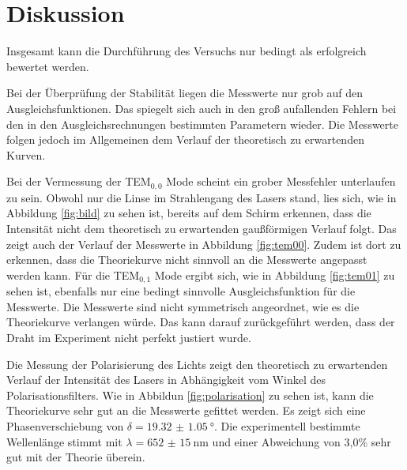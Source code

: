 \section{Diskussion}
\label{sec:Diskussion}
Insgesamt kann die Durchführung des Versuchs nur bedingt als erfolgreich
bewertet werden.

Bei der Überprüfung der Stabilität liegen die Messwerte nur grob auf den
Ausgleichsfunktionen. Das spiegelt sich auch in den groß aufallenden Fehlern bei
den in den Ausgleichsrechnungen bestimmten Parametern wieder. Die Messwerte folgen
jedoch im Allgemeinen dem Verlauf der theoretisch zu erwartenden Kurven.

Bei der Vermessung der TEM$_{\mathrm{0,0}}$ Mode scheint ein grober Messfehler
unterlaufen zu sein. Obwohl nur die Linse im Strahlengang des Lasers
stand, lies sich, wie in Abbildung \ref{fig:bild} zu sehen ist, bereits auf dem
Schirm erkennen, dass die Intensität nicht dem theoretisch zu erwartenden gaußförmigen
Verlauf folgt. Das zeigt auch der Verlauf der Messwerte in Abbildung \ref{fig:tem00}.
Zudem ist dort zu erkennen, dass die Theoriekurve nicht sinnvoll an die Messwerte
angepasst werden kann.
Für die TEM$_{\mathrm{0,1}}$ Mode ergibt sich, wie in Abbildung \ref{fig:tem01} zu
sehen ist, ebenfalls nur eine bedingt sinnvolle Ausgleichsfunktion für die Messwerte.
Die Messwerte sind nicht symmetrisch angeordnet, wie es die Theoriekurve verlangen würde.
Das kann darauf zurückgeführt werden, dass der Draht im Experiment nicht perfekt
justiert wurde.

Die Messung der Polarisierung des Lichts zeigt den theoretisch zu erwartenden Verlauf
der Intensität des Lasers in Abhängigkeit vom Winkel des Polarisationsfilters. Wie
in Abbildun \ref{fig:polarisation} zu sehen ist, kann die Theoriekurve sehr gut an
die Messwerte gefittet werden. Es zeigt sich eine Phasenverschiebung von $\delta=\SI{19.32(105)}{\degree}$.
Die experimentell bestimmte Wellenlänge stimmt mit $\lambda=\SI{652(15)}{\nano\metre}$
und einer Abweichung von 3{,}0\% sehr gut mit der Theorie überein.

